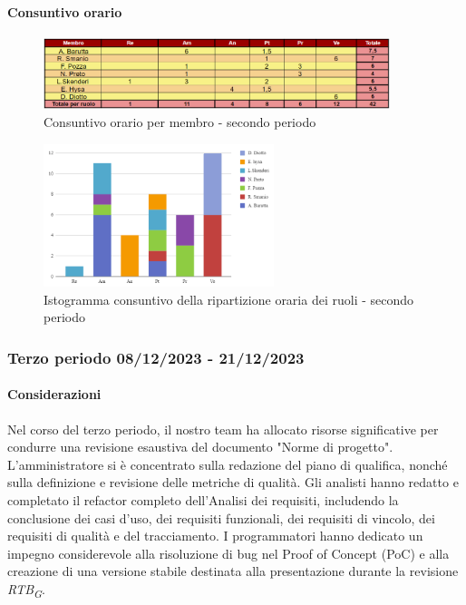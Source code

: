 \paragraph{Consuntivo orario } \hspace{1pt}

\begin{figure}[H]
    \centering
    \includegraphics[width=0.9\textwidth]{../Images/consuntivoOrario2Periodo.png}
    \caption{Consuntivo orario per membro - secondo periodo}
    \label{fig:Constuntivo_orario_2}
\end{figure}

\begin{figure}[H]
    \centering
    \includegraphics[width=0.6\textwidth]{../Images/consuntivoDivisioneRuoli2Periodo.png}
    \caption{Istogramma consuntivo della ripartizione oraria dei ruoli - secondo periodo}
    \label{fig:Consuntivo_ripartizione_oraria_2}
\end{figure}




\subsubsection{Terzo periodo  08/12/2023 - 21/12/2023}
\paragraph{Considerazioni}
Nel corso del terzo periodo, il nostro team ha allocato risorse significative per condurre una revisione esaustiva del documento "Norme di progetto". L'amministratore si è concentrato sulla redazione del piano di qualifica, nonché sulla definizione e revisione delle metriche di qualità. Gli analisti hanno redatto e completato il refactor completo dell'Analisi dei requisiti, includendo la conclusione dei casi d'uso, dei requisiti funzionali, dei requisiti di vincolo, dei requisiti di qualità e del tracciamento. I programmatori hanno dedicato un impegno considerevole alla risoluzione di bug nel Proof of Concept (PoC) e alla creazione di una versione stabile destinata alla presentazione durante la revisione \textit{RTB}\textsubscript{\textit{G}}.

